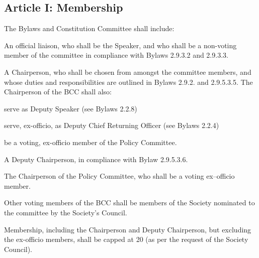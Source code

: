 \subsection{Article I: Membership}
\begin{longenum}[ label*=\thesubsection.\arabic*., align=left] 
\item The Bylaws and Constitution Committee shall include:
	\begin{longenum}[ label*=\arabic*., align=left] 
	\item An official liaison, who shall be the Speaker, and who shall be a non-voting member of the committee in compliance with Bylaws 2.9.3.2 and 2.9.3.3.
	\item A Chairperson, who shall be chosen from amongst the committee members, and whose duties and responsibilities are outlined in Bylaws 2.9.2. and 2.9.5.3.5. The Chairperson of the BCC shall also:
		\begin{longenum}[ label*=\arabic*., align=left] 
		\item serve as Deputy Speaker (see Bylaws 2.2.8)
		\item serve, ex-officio, as Deputy Chief Returning Officer (see Bylaws 2.2.4)
		\item be a voting, ex-officio member of the Policy Committee.
		\end{longenum}
	\item A Deputy Chairperson, in compliance with Bylaw 2.9.5.3.6.
	\item The Chairperson of the Policy Committee, who shall be a voting ex–officio member.
	\end{longenum}
\item Other voting members of the BCC shall be members of the Society nominated to the committee by the Society's Council.
\item Membership, including the Chairperson and Deputy Chairperson, but excluding the ex-officio members, shall be capped at 20 (as per the request of the Society Council).
\end{longenum}

